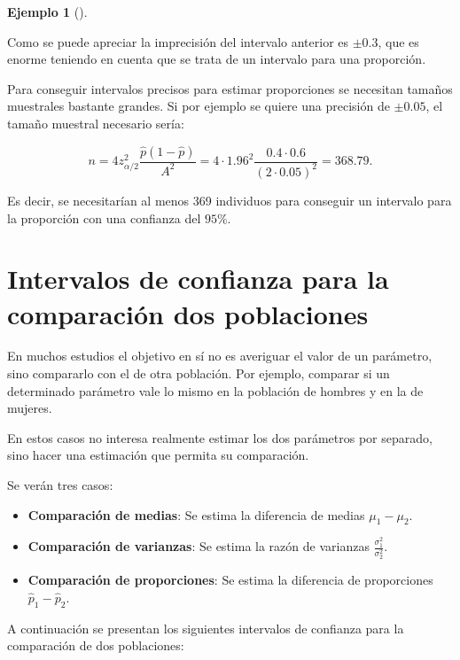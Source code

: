 \documentclass[
  a4paper,
]{scrreport}
\providecommand{\tightlist}{%
  \setlength{\itemsep}{0pt}\setlength{\parskip}{0pt}}\usepackage{longtable,booktabs,array}
\theoremstyle{plain}
\theoremstyle{definition}
\theoremstyle{definition}
\newtheorem{example}{Ejemplo}[chapter]
\theoremstyle{remark}
\begin{document}
\begin{example}[]\protect\hypertarget{exm-tamaño-muestral-intervalo-confianza-proporcion}{}\label{exm-tamaño-muestral-intervalo-confianza-proporcion}

Como se puede apreciar la imprecisión del intervalo anterior es
\(\pm 0.3\), que es enorme teniendo en cuenta que se trata de un
intervalo para una proporción.

Para conseguir intervalos precisos para estimar proporciones se
necesitan tamaños muestrales bastante grandes. Si por ejemplo se quiere
una precisión de \(\pm 0.05\), el tamaño muestral necesario sería:

\[
n= 4 z_{\alpha/2}^2\frac{\hat{p}(1-\hat{p})}{A^2}=4\cdot 1.96^2\frac{0.4\cdot 0.6}{(2\cdot0.05)^2}= 368.79.
\]

Es decir, se necesitarían al menos 369 individuos para conseguir un
intervalo para la proporción con una confianza del \(95\%\).

\end{example}

\section{Intervalos de confianza para la comparación dos
poblaciones}\label{intervalos-de-confianza-para-la-comparaciuxf3n-dos-poblaciones}

En muchos estudios el objetivo en sí no es averiguar el valor de un
parámetro, sino compararlo con el de otra población. Por ejemplo,
comparar si un determinado parámetro vale lo mismo en la población de
hombres y en la de mujeres.

En estos casos no interesa realmente estimar los dos parámetros por
separado, sino hacer una estimación que permita su comparación.

Se verán tres casos:

\begin{itemize}
\tightlist
\item
  \textbf{Comparación de medias}: Se estima la diferencia de medias
  \(\mu_1-\mu_2\).
\item
  \textbf{Comparación de varianzas}: Se estima la razón de varianzas
  \(\displaystyle \frac{\sigma^2_1}{\sigma^2_2}\).
\item
  \textbf{Comparación de proporciones}: Se estima la diferencia de
  proporciones \(\hat p_1-\hat p_2\).
\end{itemize}

A continuación se presentan los siguientes intervalos de confianza para
la comparación de dos poblaciones:
\end{document}
